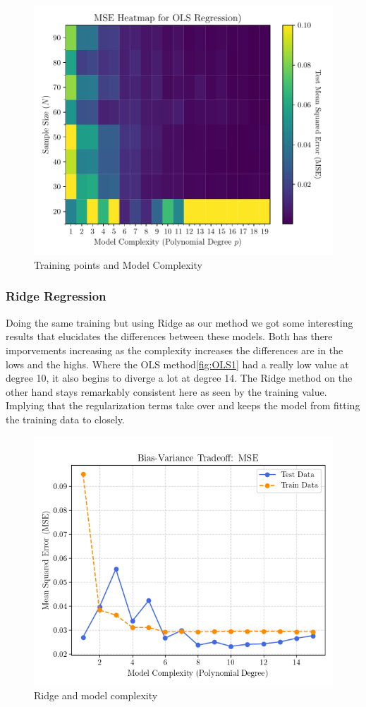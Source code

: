 \documentclass[amssymb,twocolumn,aps]{revtex4}
\begin{document}
\begin{figure}[h]
    \centering
    \includegraphics[width=.95 \linewidth]{Figures/OLS_Heatmap.pdf}
    \caption{Training points and Model Complexity}
    \label{fig:OLSHeat}
\end{figure}

\subsubsection{Ridge Regression}
Doing the same training but using Ridge as our method we got some interesting results that elucidates the differences between these models.
Both has there imporvements increasing as the complexity increases the differences are in the lows and the highs.
Where the OLS method\ref{fig:OLS1} had a really low value at degree 10, it also begins to diverge a lot at degree 14.
The Ridge method on the other hand stays remarkably consistent here as seen by the training value. 
Implying that the regularization terms take over and keeps the model from fitting the training data to closely. 

\begin{figure}[h]
    \centering
    \includegraphics[width=.95 \linewidth]{Figures/MSE_RidgeOnly.png}
    \caption{Ridge and model complexity}
    \label{fig:OLSHeat}
\end{figure}
\end{document}
